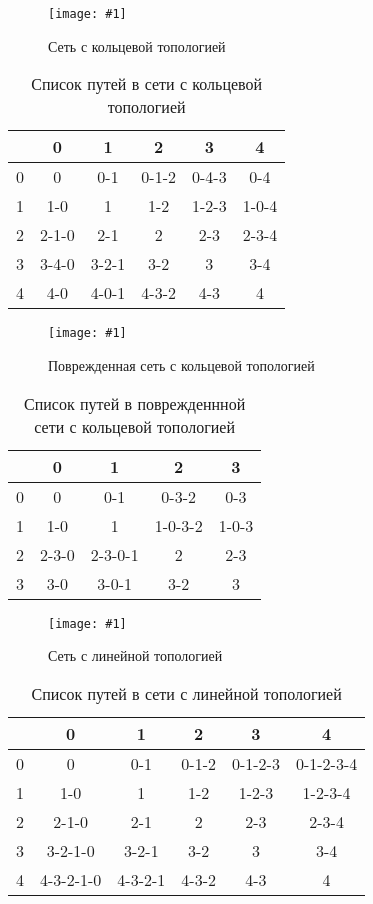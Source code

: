 \documentclass[a4paper,12pt]{article}
\newcommand{\plot}[3]{
  \begin{figure}[H]
    \begin{center}
      \texttt{[image: \#1]}
      \caption{#2}
      \label{#3}
    \end{center}
  \end{figure}
}
\begin{document}
\plot{./images/TopologyRing.png}{Сеть с кольцевой топологией}{p:rl}

\begin{table}[H]
  \caption{Список путей в сети с кольцевой топологией}
  \begin{tabular}{| c | c | c | c | c | c |}
    \hline
             & 0 & 1 & 2 & 3 & 4 \\
             \hline
    0 & 0 & 0-1 & 0-1-2 & 0-4-3 & 0-4 \\
    \hline
    1 & 1-0 & 1 & 1-2 & 1-2-3 & 1-0-4 \\
    \hline
    2 & 2-1-0 & 2-1 & 2 & 2-3 & 2-3-4 \\
    \hline
    3 & 3-4-0 & 3-2-1 & 3-2 & 3 & 3-4 \\
    \hline
    4 & 4-0 & 4-0-1 & 4-3-2 & 4-3 & 4 \\
    \hline
  \end{tabular}
  \centering
\end{table}

\plot{./images/TopologyRing_corrupted.png}{Поврежденная сеть с кольцевой
топологией}{p:rl_c}

\begin{table}[H]
  \caption{Список путей в поврежденнной сети с кольцевой топологией}
  \begin{tabular}{| c | c | c | c | c |}
    \hline
             & 0 & 1 & 2 & 3 \\
             \hline
    0 & 0 & 0-1 & 0-3-2 & 0-3 \\
    \hline
    1 & 1-0 & 1 & 1-0-3-2 & 1-0-3 \\
    \hline
    2 & 2-3-0 & 2-3-0-1 & 2 & 2-3 \\
    \hline
    3 & 3-0 & 3-0-1 & 3-2 & 3 \\
    \hline
  \end{tabular}
  \centering
\end{table}

\plot{./images/TopologyLine.png}{Сеть с линейной топологией}{p:tl}

\begin{table}[H]
  \caption{Список путей в сети с линейной топологией}
  \begin{tabular}{| c | c | c | c | c | c |}
    \hline
             & 0 & 1 & 2 & 3 & 4 \\
             \hline
    0 & 0 & 0-1 & 0-1-2 & 0-1-2-3 & 0-1-2-3-4 \\
    \hline
    1 & 1-0 & 1 & 1-2 & 1-2-3 & 1-2-3-4 \\
    \hline
    2 & 2-1-0 & 2-1 & 2 & 2-3 & 2-3-4 \\
    \hline
    3 & 3-2-1-0 & 3-2-1 & 3-2 & 3 & 3-4 \\
    \hline
    4 & 4-3-2-1-0 & 4-3-2-1 & 4-3-2 & 4-3 & 4\\
    \hline
  \end{tabular}
  \centering
\end{table}
\end{document}

